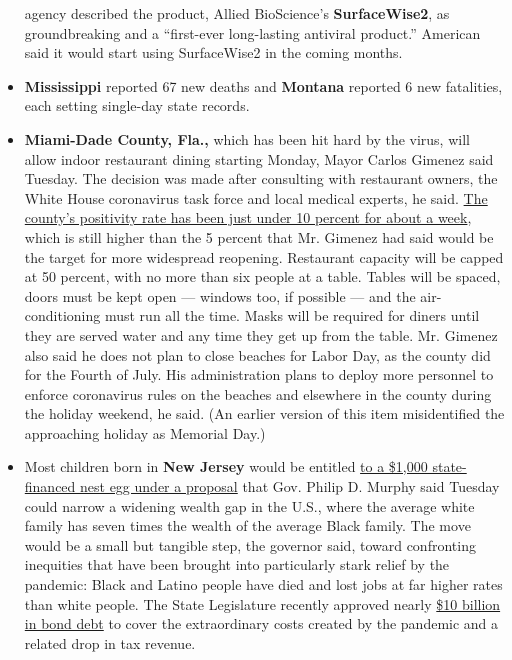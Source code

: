 \begin{itemize}
  agency described the product, Allied BioScience's
  \textbf{SurfaceWise2}, as groundbreaking and a ``first-ever
  long-lasting antiviral product.'' American said it would start using
  SurfaceWise2 in the coming months.
\item
  \textbf{Mississippi} reported 67 new deaths and \textbf{Montana}
  reported 6 new fatalities, each setting single-day state records.
\item
  \textbf{Miami-Dade County, Fla.,} which has been hit hard by the
  virus, will allow indoor restaurant dining starting Monday, Mayor
  Carlos Gimenez said Tuesday. The decision was made after consulting
  with restaurant owners, the White House coronavirus task force and
  local medical experts, he said.
  \href{http://www.miamidade.gov/information/library/2020-08-25-new-normal-dashboard.pdf}{The
  county's positivity rate has been just under 10 percent for about a
  week}, which is still higher than the 5 percent that Mr. Gimenez had
  said would be the target for more widespread reopening. Restaurant
  capacity will be capped at 50 percent, with no more than six people at
  a table. Tables will be spaced, doors must be kept open --- windows
  too, if possible --- and the air-conditioning must run all the time.
  Masks will be required for diners until they are served water and any
  time they get up from the table. Mr. Gimenez also said he does not
  plan to close beaches for Labor Day, as the county did for the Fourth
  of July. His administration plans to deploy more personnel to enforce
  coronavirus rules on the beaches and elsewhere in the county during
  the holiday weekend, he said. (An earlier version of this item
  misidentified the approaching holiday as Memorial Day.)
\item
  Most children born in \textbf{New Jersey} would be entitled
  \href{https://www.nytimes3xbfgragh.onion/2020/08/25/nyregion/baby-bond-nj.html}{to
  a \$1,000 state-financed nest egg under a proposal} that Gov. Philip
  D. Murphy said Tuesday could narrow a widening wealth gap in the U.S.,
  where the average white family has seven times the wealth of the
  average Black family. The move would be a small but tangible step, the
  governor said, toward confronting inequities that have been brought
  into particularly stark relief by the pandemic: Black and Latino
  people have died and lost jobs at far higher rates than white people.
  The State Legislature recently approved nearly
  \href{https://www.njspotlight.com/2020/07/nj-debt-covid-19-bond-sales-could-add-big-amount-to-state-borrowing-totals/}{\$10
  billion in bond debt} to cover the extraordinary costs created by the
  pandemic and a related drop in tax revenue.


\end{itemize}
